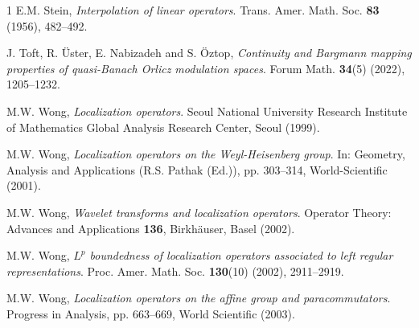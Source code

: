 \documentclass[a4paper,11pt, reqno]{amsart}
\theoremstyle{plain}
\theoremstyle{definition}
\theoremstyle{remark}
\begin{document}
\begin{thebibliography}{1}
E.M. Stein, {\it Interpolation of linear operators}. Trans. Amer. Math. Soc. \textbf{83} (1956), 482--492.

J. Toft, R. \"Uster, E. Nabizadeh and S. \"Oztop, {\it Continuity and Bargmann mapping properties of quasi-Banach Orlicz modulation spaces}. Forum Math. \textbf{34}(5) (2022), 1205--1232.

M.W. Wong, {\it Localization operators}. Seoul National University Research Institute of Mathematics Global Analysis Research Center, Seoul (1999).

M.W. Wong, {\it Localization operators on the Weyl-Heisenberg group}. In: Geometry, Analysis and Applications (R.S. Pathak (Ed.)), pp. 303--314, World-Scientific (2001).

M.W. Wong, {\it Wavelet transforms and localization operators}.  Operator Theory: Advances and Applications   \textbf{136},  Birkh\"auser, Basel (2002).

M.W. Wong, {\it $L^p$ boundedness of localization operators associated to left regular representations}. Proc. Amer. Math. Soc. \textbf{130}(10) (2002), 2911--2919.

M.W. Wong, {\it Localization operators on the affine group and paracommutators}. Progress in Analysis, pp. 663--669, World Scientific (2003).

\end{thebibliography}
\end{document}
